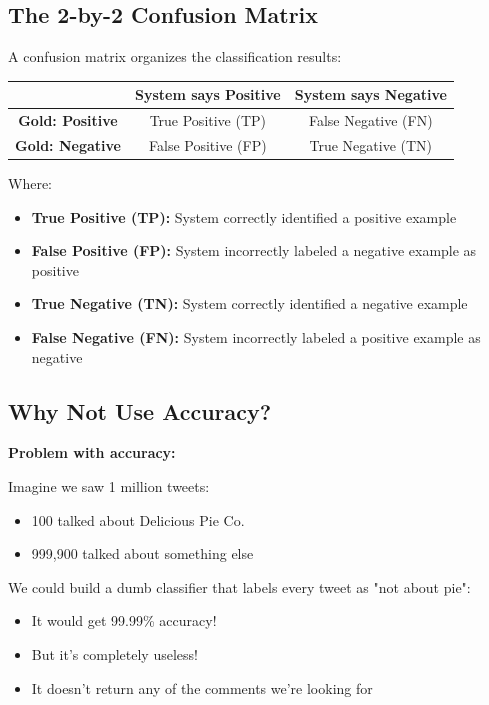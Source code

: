 \documentclass[11pt,a4paper]{article}
\theoremstyle{definition}
\theoremstyle{plain}
\theoremstyle{remark}
\begin{document}
\subsection{The 2-by-2 Confusion Matrix}

A confusion matrix organizes the classification results:

\begin{center}
\begin{tabular}{|c|c|c|}
\hline
 & \textbf{System says Positive} & \textbf{System says Negative} \\
\hline
\textbf{Gold: Positive} & True Positive (TP) & False Negative (FN) \\
\hline
\textbf{Gold: Negative} & False Positive (FP) & True Negative (TN) \\
\hline
\end{tabular}
\end{center}

Where:
\begin{itemize}
    \item \textbf{True Positive (TP):} System correctly identified a positive example
    \item \textbf{False Positive (FP):} System incorrectly labeled a negative example as positive
    \item \textbf{True Negative (TN):} System correctly identified a negative example
    \item \textbf{False Negative (FN):} System incorrectly labeled a positive example as negative
\end{itemize}

\subsection{Why Not Use Accuracy?}

\textbf{Problem with accuracy:}

Imagine we saw 1 million tweets:
\begin{itemize}
    \item 100 talked about Delicious Pie Co.
    \item 999,900 talked about something else
\end{itemize}

We could build a dumb classifier that labels every tweet as "not about pie":
\begin{itemize}
    \item It would get 99.99\% accuracy!
    \item But it's completely useless!
    \item It doesn't return any of the comments we're looking for
\end{itemize}
\end{document}
